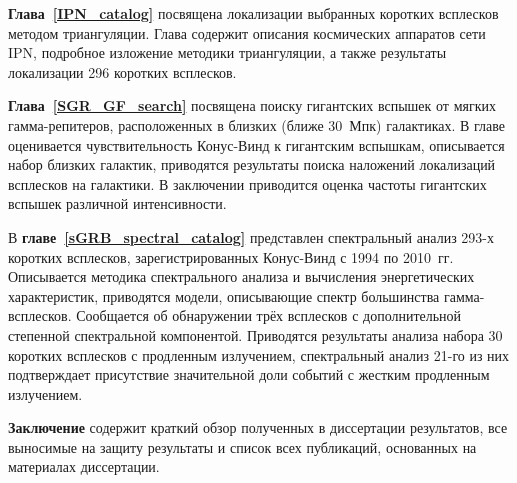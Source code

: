 \textbf{Глава~\ref{IPN_catalog}} посвящена локализации выбранных коротких всплесков 
методом триангуляции. Глава содержит описания космических аппаратов сети IPN, 
подробное изложение методики триангуляции, а также результаты локализации 
296 коротких всплесков.  

\textbf{Глава~\ref{SGR_GF_search}} посвящена поиску гигантских вспышек от мягких
гамма-репитеров, расположенных в близких (ближе 30~Мпк) галактиках.
В главе оценивается чувствительность Конус-Винд к гигантским вспышкам, 
описывается набор близких галактик, приводятся результаты поиска наложений локализаций
всплесков на галактики. В заключении приводится оценка частоты гигантских вспышек различной 
интенсивности.

В \textbf{главе~\ref{sGRB_spectral_catalog}} представлен спектральный анализ 293-х
коротких всплесков, зарегистрированных Конус-Винд с 1994 по 2010~гг. 
Описывается методика спектрального анализа и вычисления энергетических характеристик,
приводятся модели, описывающие спектр большинства гамма-всплесков.
Сообщается об обнаружении трёх всплесков с дополнительной степенной спектральной
компонентой. Приводятся результаты анализа набора 30 коротких всплесков с продленным излучением, 
спектральный анализ 21-го из них подтверждает присутствие значительной доли 
событий с жестким продленным излучением.   

\textbf{Заключение} содержит краткий обзор полученных в диссертации результатов, 
все выносимые на защиту результаты и список всех публикаций, 
основанных на материалах диссертации.

\clearpage